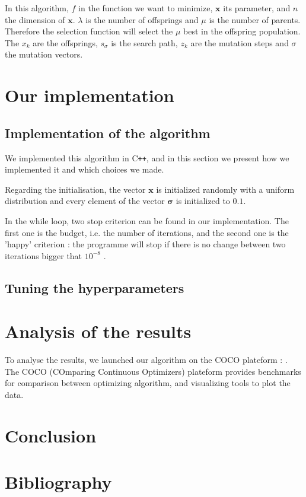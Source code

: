\documentclass[transmag]{IEEEtran}
\def\CPP{C\texttt{++}}
\begin{document}
In this algorithm, $f$ in the function we want to minimize, $\bm{x}$ its parameter, and $n$ the dimension of $\bm{x}$. $\lambda$ is the number of offsprings and $\mu$ is the number of parents. Therefore the selection function will select the $\mu$ best in the offspring population. The $x_k$ are the offsprings, $s_{\sigma}$ is the search path, $z_k$ are the mutation steps and $\sigma$ the mutation vectors. 


\section{Our implementation}

\subsection{Implementation of the algorithm}

We implemented this algorithm in \CPP, and in this section we present how we implemented it and which choices we made. 

Regarding the initialisation, the vector $\bm{x}$ is initialized randomly with a uniform distribution and every element of the vector $\bm{\sigma}$ is initialized to $0.1$. 

In the while loop, two stop criterion can be found in our implementation. The first one is the budget, i.e. the number of iterations, and the second one is the 'happy' criterion : the programme will stop if there is no change between two iterations bigger that $10^{-8}$ .


\subsection{Tuning the hyperparameters}
 

\section{Analysis of the results}

To analyse the results, we launched our algorithm on the COCO plateform : \cite{coco}. The COCO (COmparing Continuous Optimizers) plateform provides benchmarks for comparison between optimizing algorithm, and visualizing tools to plot the data.


\section{Conclusion}


\section{Bibliography}


\end{document}
